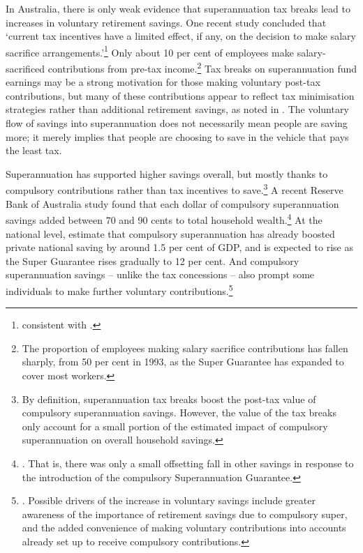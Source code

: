 \documentclass{grattanAlpha}
\begin{document}
In Australia, there is only weak evidence that superannuation tax breaks lead to increases in voluntary retirement savings. One recent study concluded that ‘current tax incentives have a limited effect, if any, on the decision to make salary sacrifice arrangements.’\footnote{\textcite{Feng2014} consistent with .}
Only about 10 per cent of employees make salary-sacrificed contributions from pre-tax income.\footnote{\textcite{ABS2013t} The proportion of employees making salary sacrifice contributions has fallen sharply, from 50 per cent in 1993, as the Super Guarantee has expanded to cover most workers.}
Tax breaks on superannuation fund earnings may be a strong motivation for those making voluntary post-tax contributions, but many of these contributions appear to reflect tax minimisation strategies rather than additional retirement savings, as noted in . The voluntary flow of savings into superannuation does not necessarily mean people are saving more; it merely implies that people are choosing to save in the vehicle that pays the least tax. 

Superannuation has supported higher savings overall, but mostly thanks to compulsory contributions rather than tax incentives to save.\footnote{By definition, superannuation tax breaks boost the post-tax value of compulsory superannuation savings. However, the value of the tax breaks only account for a small portion of the estimated impact of compulsory superannuation on overall household savings.} 
A recent Reserve Bank of Australia study found that each dollar of compulsory superannuation savings added between 70 and 90 cents to total household wealth.\footnote{\textcite{Connolly2007}. That is, there was only a small offsetting fall in other savings in response to the introduction of the compulsory Superannuation Guarantee.} 
At the national level, \textcite{GruenSoding2011} estimate that compulsory superannuation has already boosted private national saving by around 1.5 per cent of GDP, and is expected to rise as the Super Guarantee rises gradually to 12 per cent. And compulsory superannuation savings – unlike the tax concessions – also prompt some individuals to make further voluntary contributions.\footnote{\textcite[][4]{Connolly2007}. Possible drivers of the increase in voluntary savings include greater awareness of the importance of retirement savings due to compulsory super, and the added convenience of making voluntary contributions into accounts already set up to receive compulsory contributions.}
\end{document}
